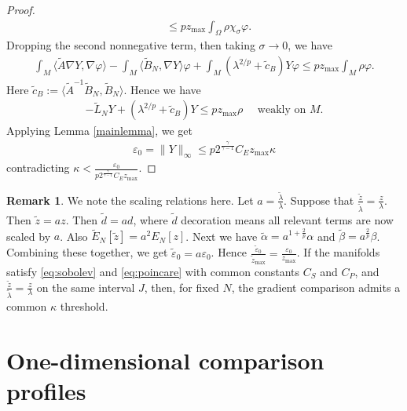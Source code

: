 \documentclass[11pt]{amsart}
\def \eps {\varepsilon}
\theoremstyle{definition}
\newtheorem{remark}{Remark}[section]
\begin{document}
\begin{proof}
\begin{align*}
    &\leq pz_{\max}\int_\Omega\rho \chi_\sigma\varphi.
\end{align*}
Dropping the second nonnegative term, then taking $\sigma\to 0$, we have
\begin{align*}
    \int_M\langle \tilde{A}\nabla Y,\nabla \varphi\rangle-\int_M\langle \tilde{B}_N,\nabla Y\rangle\varphi+\int_M(\lambda^{2/p}+\tilde{c}_B)Y\varphi \leq pz_{\max}\int_M\rho\varphi.
\end{align*}
Here $\tilde{c}_B:=\langle \tilde{A}^{-1}\tilde{B}_N,\tilde{B}_N\rangle$.  Hence we have
\begin{align*}
    -\tilde{L}_NY+(\lambda^{2/p}+\tilde{c}_B)Y\leq pz_{\max}\rho \quad \text{ weakly on }M.
\end{align*}
Applying Lemma \ref{mainlemma}, we get
\begin{align*}
    \eps_0=\|Y\|_\infty\leq p2^{\frac{\gamma}{\gamma-1}}C_Ez_{\max}\kappa
\end{align*}
contradicting $\kappa < \frac{\eps_0}{p2^{\frac{\gamma}{\gamma-1}}C_Ez_{\max}}.$
\end{proof}

\begin{remark}\label{rescaling}
    We note the scaling relations here. Let $a=\frac{\tilde\lambda}{\lambda}$.  Suppose that $\displaystyle\frac{\tilde{z}}{\tilde{\lambda}}=\frac{z}{\lambda}$.  Then $\tilde{z}=az$.  Then $\tilde{d}=ad$, where $\tilde{d}$ decoration means all relevant terms are now scaled by $a$. Also $\tilde{E}_N[\tilde{z}]=a^2E_N[z]$.  Next we have $\tilde{\alpha}=a^{1+\frac{2}{p}}\alpha$ and $\tilde{\beta}=a^{\frac{2}{p}}\beta$. Combining these together, we get $\tilde{\eps}_0=a\eps_0$.  Hence $\frac{\tilde{\eps}_0}{\tilde{z}_{\max}}=\frac{\eps_0}{z_{\max}}$. If the manifolds satisfy \eqref{eq:sobolev} and \eqref{eq:poincare} with common constants $C_S$ and $C_P$, and  $\displaystyle\frac{\tilde{z}}{\tilde{\lambda}}=\frac{z}{\lambda}$ on the same interval $J$, then, for fixed $N$, the gradient comparison admits a common $\kappa$ threshold.
\end{remark}

\section{One-dimensional comparison profiles}
\end{document}
